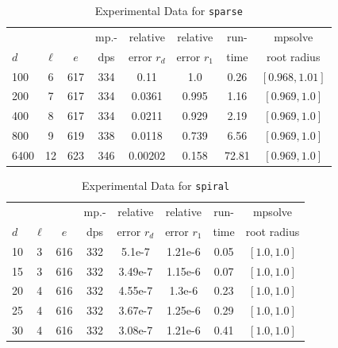 \documentclass[runningheads]{llncs}
\begin{document}
\begin{table}
\caption{Experimental Data for \texttt{sparse}}
\label{tab:sparse}
\vskip -0.15in
\begin{center}
\begin{small}
\begin{sc}
\begin{tabular}{lccccccc}
\toprule
&  &  & mp.-& relative  & relative & run- & mpsolve \\
$d$& $\ell$& $e$ & dps&error $r_d$       & error $r_1$ &time& root radius\\
\midrule
100 & 6 & 617 & 334 & 0.11 & 1.0 & 0.26 & $[0.968, 1.01]$\\
 200 & 7 & 617 & 334 & 0.0361 & 0.995 & 1.16 & $[0.969, 1.0]$\\
 400 & 8 & 617 & 334 & 0.0211 & 0.929 & 2.19 & $[0.969, 1.0]$\\
 800 & 9 & 619 & 338 & 0.0118 & 0.739 & 6.56 & $[0.969, 1.0]$\\
  6400 & 12 & 623 & 346 & 0.00202 & 0.158 & 72.81 & $[0.969, 1.0]$\\
\bottomrule
\end{tabular}
\end{sc}
\end{small}
\end{center}
\vskip 0.05in
\end{table}

\begin{table}
\caption{Experimental Data for \texttt{spiral}} %
\label{tab:spiral}
\vskip -0.15in
\begin{center}
\begin{small}
\begin{sc}
\begin{tabular}{lccccccc}
\toprule
&  &  & mp.-& relative  & relative & run- & mpsolve \\
$d$& $\ell$& $e$ & dps&error $r_d$       & error $r_1$ &time& root radius\\
\midrule
 10 & 3 & 616 & 332 & 5.1e-7 & 1.21e-6 & 0.05 & $[1.0, 1.0]$\\
 15 & 3 & 616 & 332 & 3.49e-7 & 1.15e-6 & 0.07 & $[1.0, 1.0]$\\
 20 & 4 & 616 & 332 & 4.55e-7 & 1.3e-6 & 0.23 & $[1.0, 1.0]$\\
 25 & 4 & 616 & 332 & 3.67e-7 & 1.25e-6 & 0.29 & $[1.0, 1.0]$\\
 30 & 4 & 616 & 332 & 3.08e-7 & 1.21e-6 & 0.41 & $[1.0, 1.0]$\\
\bottomrule
\end{tabular}
\end{sc}
\end{small}
\end{center}
\vskip 0.05in
\end{table}
\end{document}
